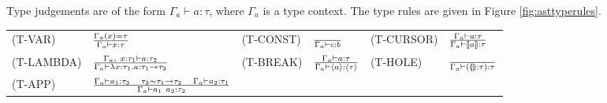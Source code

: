 Type judgements are of the form $\Gamma_a \vdash a : \tau$, where
$\Gamma_a$ is a type context. The type rules are given in Figure
\ref{fig:asttyperules}.

\begin{figure*}
  \center
  \renewcommand{\arraystretch}{2}
  \begin{tabular}{llllll}
    \scriptsize(T-VAR)    & $ \TVar $   & \scriptsize(T-CONST) & $ \TConst$ & \scriptsize(T-CURSOR) & $ \TCursor $ \\
    \scriptsize(T-LAMBDA) & $ \TLambda$ & \scriptsize(T-BREAK) & $\TBreak$  & \scriptsize(T-HOLE)   & $\THole$     \\
    \scriptsize(T-APP)    & $\TApp$     &                      &            &                       &
  \end{tabular}
  \caption{AST type rules}
  \label{fig:asttyperules}
\end{figure*}

